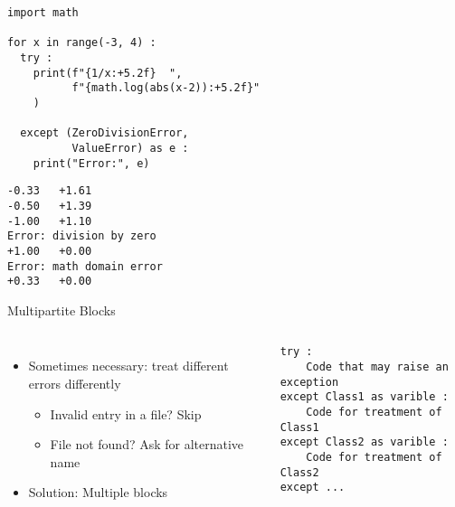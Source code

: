 
\begin{frame}[fragile]
%
\begin{tcbraster}[raster columns=2,
                  raster equal height,
                  nobeforeafter,
                  raster column skip=0.2cm]
\begin{codebox}
\begin{verbatim}
import math

for x in range(-3, 4) :
  try :
    print(f"{1/x:+5.2f}  ",
          f"{math.log(abs(x-2)):+5.2f}"
    )

  except (ZeroDivisionError, 
          ValueError) as e :
    print("Error:", e)
\end{verbatim}
\end{codebox}
%
\begin{cmdbox}
\begin{verbatim}
-0.33   +1.61
-0.50   +1.39
-1.00   +1.10
Error: division by zero
+1.00   +0.00
Error: math domain error
+0.33   +0.00
\end{verbatim}
\end{cmdbox}
\end{tcbraster}
%
\end{frame}


\begin{frame}[fragile]{Multipartite  Blocks}
%
\begin{columns}[T]
\begin{itemize}
\item Sometimes necessary: treat different errors differently
	\begin{itemize}
	\item Invalid entry in a file? Skip
	\item File not found? Ask for alternative name
	\end{itemize}
\item Solution: Multiple  blocks
\end{itemize}
%
\vspace{-6pt}
\begin{codebox}
\begin{verbatim}
try :
    Code that may raise an exception
except Class1 as varible :
    Code for treatment of Class1
except Class2 as varible :
    Code for treatment of Class2
except ...
\end{verbatim}
\end{codebox}
\end{columns}
%
\end{frame}

